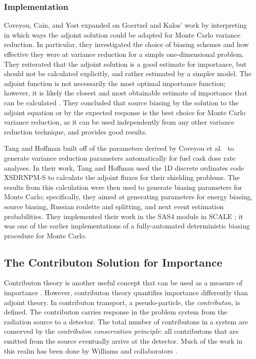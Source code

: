 \subsubsection{Implementation}

Coveyou, Cain, and Yost \cite{coveyou_adjoint_1967} expanded on Goertzel and
Kalos' work by interpreting in which ways the adjoint solution could be adapted
for Monte Carlo variance reduction. In particular, they investigated the choice
of biasing schemes and how effective they were at variance reduction for a
simple one-dimensional problem. They reiterated that the adjoint solution is a
good estimate for importance, but should not be calculated explicitly, and
rather estimated by a simpler model. The adjoint function is not necessarily the
most optimal importance function; however, it is likely the closest and most
obtainable estimate of importance that can be calculated
\cite{coveyou_adjoint_1967}. They
concluded that source biasing by the solution to the adjoint equation or by the
expected response is the best choice for Monte Carlo variance reduction, as it
can be used independently from any other variance reduction technique, and
provides good results.

Tang and Hoffman \cite{tang_monte_1988} built off of the parameters derived by
Coveyou et al.\ \cite{coveyou_adjoint_1967} to generate variance reduction
parameters automatically for fuel cask dose rate analyses. In their work, Tang
and Hoffman used the 1D discrete ordinates code XSDRNPM-S to
calculate the adjoint fluxes for their shielding problems. The results from this
calculation were then used to generate biasing parameters for Monte Carlo;
specifically, they aimed at generating parameters for energy biasing, source
biasing, Russian roulette and splitting, and next event estimation
probabilities. They implemented their work in the SAS4 module in SCALE
\cite{SCALE6_1}; it was
one of the earlier implementations of a fully-automated deterministic
biasing procedure for Monte Carlo.

\subsection{The Contributon Solution for Importance}
\label{sec:ContributonImportance}

Contributon theory is another useful concept that can be used as a measure of
importance
\cite{williams_generalized_1991,williams_contributorn_1992,williams_contributon_study}.
However, contributon theory quantifies importance differently than
adjoint theory. In contributon transport, a pseudo-particle, the
\textit{contributon}, is defined. The contributon carries response in the problem
system from the radiation source to a detector. The
total number of contributons in a system are conserved by the \textit{contributon
conservation principle}: all contributons that are emitted from the source
eventually arrive at the detector. Much of the work in this realm has been done
by Williams and collaborators
\cite{williams_generalized_1991,williams_contributorn_1992,williams_contributon_study}.


